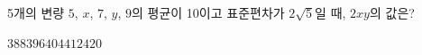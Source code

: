5개의 변량 $5$, $x$, $7$, $y$, $9$의 평균이 10이고 표준편차가 $2\sqrt{5}$일 때, $2xy$의 값은?
\begin{choices32}{$388$}{$396$}{$404$}{$412$}{$420$}\end{choices32}
